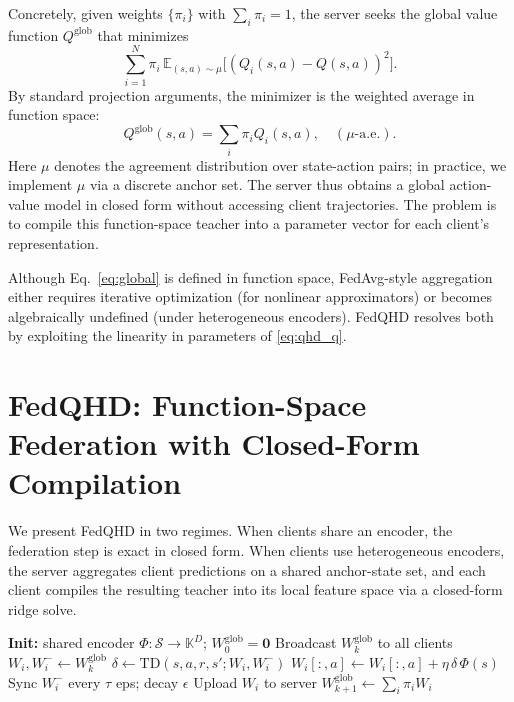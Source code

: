 \documentclass[sigconf,anonymous]{aamas}
\theoremstyle{plain}
\theoremstyle{definition}
\theoremstyle{remark}
\begin{document}
Concretely, given weights $\{\pi_i\}$ with $\sum_i\pi_i=1$, the server seeks the global value function $Q^{\mathrm{glob}}$ that minimizes
\begin{equation}\label{eq:global}
\sum_{i=1}^N \pi_i\,\mathbb{E}_{(s,a)\sim\mu}\bigl[(Q_i(s,a)-Q(s,a))^2\bigr].
\end{equation}
By standard projection arguments, the minimizer is the weighted average in function space:
\begin{equation}
Q^{\text{glob}}(s,a)=\sum_i \pi_i Q_i(s,a), \quad (\mu\text{-a.e.}).
\label{eq:qglob_avg}
\end{equation}
Here $\mu$ denotes the agreement distribution over state-action pairs; in practice, we implement $\mu$ via a discrete anchor set.
The server thus obtains a global action-value model in closed form without accessing client trajectories.
The problem is to compile this function-space teacher into a parameter vector for each client’s representation.


Although Eq.~\eqref{eq:global} is defined in function space, FedAvg-style aggregation either requires iterative optimization (for nonlinear approximators) or becomes algebraically undefined (under heterogeneous encoders). FedQHD resolves both by exploiting the linearity in parameters of \eqref{eq:qhd_q}.


\section{FedQHD: Function-Space Federation with Closed-Form Compilation}
\label{sec:method}
We present FedQHD in two regimes. When clients share an encoder, the federation step is exact in closed form. When clients use heterogeneous encoders, the server aggregates client predictions on a shared anchor-state set, and each client compiles the resulting teacher into its local feature space via a closed-form ridge solve.

\begin{algorithm}[t]
\caption{FedQHD: Homogeneous Protocol}
\label{alg:fedqhd_shared}
\begin{algorithmic}[1]
\STATE \textbf{Init:} shared encoder
       $\Phi:\mathcal{S}\to\mathbb{K}^D$;\;
       $W^{\mathrm{glob}}_0 = \mathbf{0}$
    \STATE Broadcast $W^{\mathrm{glob}}_k$ to all clients
        \STATE $W_i, W_i^- \leftarrow W^{\mathrm{glob}}_k$
            \STATE $\delta \leftarrow \text{TD}(s,a,r,s'; W_i, W_i^-)$
            \STATE $W_i[:,a] \leftarrow
           W_i[:,a] + \eta\, \delta\, \Phi(s)$
            \STATE Sync $W_i^-$ every $\tau$ eps; decay $\epsilon$
        \ENDFOR
        \STATE Upload $W_i$ to server
    \ENDFOR
    \STATE $W^{\mathrm{glob}}_{k+1} \leftarrow
           \sum_{i} \pi_i W_i$
\ENDFOR
\end{algorithmic}
\end{algorithm}
\end{document}
